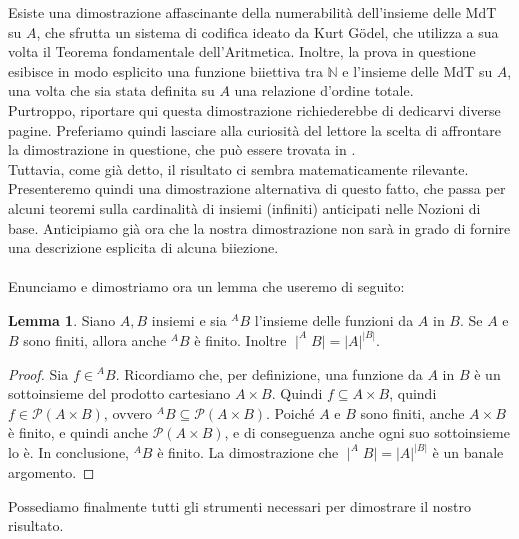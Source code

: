 \documentclass[12pt,a4paper]{report}
\theoremstyle{definition}
\newtheorem{lemma}[teo]{Lemma}  %
\begin{document}
Esiste una dimostrazione affascinante della numerabilità dell'insieme delle MdT su $A$, che sfrutta un sistema di codifica ideato da Kurt Gödel, che utilizza a sua volta il Teorema fondamentale dell'Aritmetica. Inoltre, la prova in questione esibisce in modo esplicito una funzione biiettiva tra $\mathbb{N}$ e l'insieme delle MdT su $A$, una volta che sia stata definita su $A$ una relazione d'ordine totale.\\
Purtroppo, riportare qui questa dimostrazione richiederebbe di dedicarvi diverse pagine. Preferiamo quindi lasciare alla curiosità del lettore la scelta di affrontare la dimostrazione in questione, che può essere trovata in \cite[pag. 23]{Toffalori:tesi}.\\
Tuttavia, come già detto, il risultato ci sembra matematicamente rilevante. Presenteremo quindi una dimostrazione alternativa di questo fatto, che passa per alcuni teoremi sulla cardinalità di insiemi (infiniti) anticipati nelle Nozioni di base. Anticipiamo già ora che la nostra dimostrazione non sarà in grado di fornire una descrizione esplicita di alcuna biiezione.\\
\\
Enunciamo e dimostriamo ora un lemma che useremo di seguito:

\begin{lemma}\label{funzioni_finite}
Siano $A,B$ insiemi e sia $^A B$ l'insieme delle funzioni da $A$ in $B$. Se $A$ e $B$ sono finiti, allora anche $^A B$ è finito. Inoltre $\mid ^A B \mid = |A|^{|B|}$.
\begin{proof}
Sia $f \in {^A B}$. Ricordiamo che, per definizione, una funzione da $A$ in $B$ è un sottoinsieme del prodotto cartesiano $A \times B$. Quindi $f \subseteq A \times B$, quindi $f \in \mathcal{P}(A \times B)$, ovvero $^A B \subseteq \mathcal{P}(A \times B)$. Poiché $A$ e $B$ sono finiti, anche $A \times B$ è finito, e quindi anche $\mathcal{P}(A \times B)$, e di conseguenza anche ogni suo sottoinsieme lo è. In conclusione, $^A B$ è finito. La dimostrazione che $\mid ^A B \mid = |A|^{|B|}$ è un banale argomento.
\end{proof}
\end{lemma}

Possediamo finalmente tutti gli strumenti necessari per dimostrare il nostro risultato.
\end{document}
